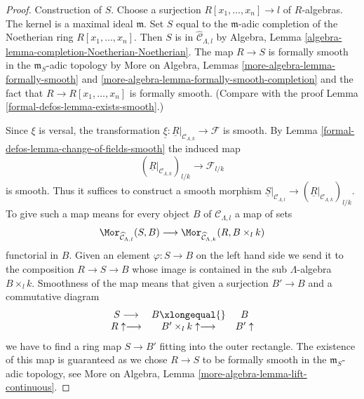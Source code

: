 \begin{proof}
Construction of $S$. Choose a surjection $R[x_1, \ldots, x_n] \to l$
of $R$-algebras. The kernel is a maximal ideal $\mathfrak m$.
Set $S$ equal to the $\mathfrak m$-adic completion of the Noetherian ring
$R[x_1, \ldots, x_n]$. Then $S$ is in $\widehat{\mathcal{C}}_{\Lambda, l}$
by Algebra, Lemma \ref{algebra-lemma-completion-Noetherian-Noetherian}.
The map $R \to S$ is formally smooth in the $\mathfrak m_S$-adic topology by
More on Algebra, Lemmas
\ref{more-algebra-lemma-formally-smooth} and
\ref{more-algebra-lemma-formally-smooth-completion}
and the fact that $R \to R[x_1, \ldots, x_n]$ is formally smooth.
(Compare with the proof Lemma \ref{formal-defos-lemma-exists-smooth}.)

\medskip\noindent
Since $\xi$ is versal, the transformation
$\underline{\xi} : \underline{R}|_{\mathcal{C}_{\Lambda, k}} \to \mathcal{F}$
is smooth. By Lemma \ref{formal-defos-lemma-change-of-fields-smooth} the induced map
$$
(\underline{R}|_{\mathcal{C}_{\Lambda, k}})_{l/k}
\longrightarrow
\mathcal{F}_{l/k}
$$
is smooth. Thus it suffices to construct a smooth morphism
$\underline{S}|_{\mathcal{C}_{\Lambda, l}} \to
(\underline{R}|_{\mathcal{C}_{\Lambda, k}})_{l/k}$.
To give such a map means for every object $B$ of $\mathcal{C}_{\Lambda, l}$
a map of sets
$$
\Mor_{\widehat{\mathcal{C}}_{\Lambda, l}}(S, B)
\longrightarrow
\Mor_{\widehat{\mathcal{C}}_{\Lambda, k}}(R, B \times_l k)
$$
functorial in $B$. Given an element $\varphi : S \to B$
on the left hand side we send it to the composition $R \to S \to B$
whose image is contained in the sub $\Lambda$-algebra $B \times_l k$.
Smoothness of the map means that given a surjection
$B' \to B$ and a commutative diagram
$$
\begin{array}{ccc}S \longrightarrow & B \xlongequal{} & B \\ R \uparrow\longrightarrow & B' \times_l k \uparrow\longrightarrow & B' \uparrow\end{array}
$$
we have to find a ring map $S \to B'$ fitting into the outer rectangle.
The existence of this map is guaranteed as we chose $R \to S$ to be
formally smooth in the $\mathfrak m_S$-adic topology, see
More on Algebra, Lemma \ref{more-algebra-lemma-lift-continuous}.
\end{proof}



